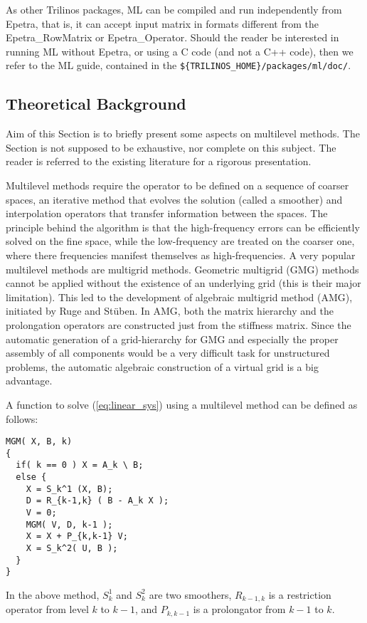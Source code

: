As other Trilinos packages, ML can be compiled and run independently
from Epetra, that is, it can accept input matrix in formats different
from the Epetra\_RowMatrix or Epetra\_Operator.  Should the reader be
interested in running ML without Epetra, or using a C code (and not a
C++ code), then we refer to the ML guide, contained in the
\verb!${TRILINOS_HOME}/packages/ml/doc/!.


\subsection{Theoretical Background}
\label{ml:theoretical}

Aim of this Section is to briefly present some aspects on multilevel
methods. The Section is not supposed to be exhaustive, nor complete on
this subject. The reader is referred to the existing literature for a
rigorous presentation.

\medskip

Multilevel methods require the operator to be defined on a sequence of
coarser spaces, an iterative method that evolves the solution (called a
smoother) and interpolation operators that transfer information between
the spaces. The principle behind the algorithm is that the
high-frequency errors can be efficiently solved on the fine space, while
the low-frequency are treated on the coarser one, where there
frequencies manifest themselves as high-frequencies. A very popular
multilevel methods are multigrid methods.  Geometric multigrid (GMG)
methods cannot be applied without the existence of an underlying grid
(this is their major limitation). This led to the development of
algebraic multigrid method (AMG), initiated by Ruge and St\"uben.  In
AMG, both the matrix hierarchy and the prolongation operators are
constructed just from the stiffness matrix.  Since the automatic
generation of a grid-hierarchy for GMG and especially the proper
assembly of all components would be a very difficult task for
unstructured problems, the automatic algebraic construction of a virtual
grid is a big advantage.

A function to solve (\ref{eq:linear_sys}) using a multilevel method can
be defined as follows:
\begin{verbatim}
MGM( X, B, k)
{
  if( k == 0 ) X = A_k \ B;
  else {
    X = S_k^1 (X, B);
    D = R_{k-1,k} ( B - A_k X );
    V = 0;
    MGM( V, D, k-1 );
    X = X + P_{k,k-1} V;
    X = S_k^2( U, B );
  }
}
\end{verbatim}
In the above method, $S_k^1$ and $S_k^2$ are two smoothers, $R_{k-1,k}$
is a restriction operator from level $k$ to $k-1$, and $P_{k,k-1}$ is a
prolongator from $k-1$ to $k$.

